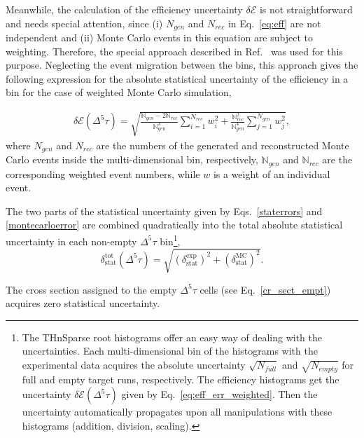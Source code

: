 Meanwhile, the calculation of the efficiency uncertainty $\delta \mathcal{E}$ is not straightforward and needs special attention, since (i) $N_{gen}$ and $N_{rec}$ in Eq.~\eqref{eq:eff} are not independent and (ii) Monte Carlo events in this equation are subject to weighting. Therefore, the special approach described in Ref.~\cite{Laforge:1996ts} was used for this purpose. Neglecting the event migration between the bins, this approach gives the following expression for the absolute statistical uncertainty of the efficiency in a bin for the case of weighted Monte Carlo simulation,

 

\begin{equation}
\begin{aligned}
\delta \mathcal{E}(\Delta^{5} \tau) = \sqrt{\frac{\mathbb{N}_{gen} - 2\mathbb{N}_{rec}}{\mathbb{N}_{gen}^{3}}\sum\limits_{i=1}^{N_{rec}} w_{i}^{2} + \frac{\mathbb{N}_{rec}^{2}}{\mathbb{N}_{gen}^{4}}\sum\limits_{j=1}^{N_{gen}} w_{j}^{2}},
\end{aligned}
\label{eq:eff_err_weighted}
\end{equation}
where $N_{gen}$ and $N_{rec}$ are the numbers of the generated and reconstructed Monte Carlo events inside the multi-dimensional bin, respectively, $\mathbb{N}_{gen}$ and  $\mathbb{N}_{rec}$ are the corresponding weighted event numbers, while $w$ is a weight of an individual event.


The two parts of the statistical uncertainty given by Eqs.~\eqref{staterrors} and \eqref{montecarloerror} are combined quadratically into the total absolute statistical uncertainty in each non-empty $\Delta^{5} \tau$ bin\footnote[3]{The THnSparse root histograms offer an easy way of dealing with the uncertainties. Each multi-dimensional bin of the histograms with the experimental data acquires the absolute uncertainty $\sqrt{N_{full}}$ and $\sqrt{N_{empty}}$ for full and empty target runs, respectively. The efficiency histograms get the uncertainty $\delta \mathcal{E}(\Delta^{5} \tau)$ given by Eq.~\eqref{eq:eff_err_weighted}. Then the uncertainty automatically propagates upon all manipulations with these histograms (addition, division, scaling).},
\begin{equation}
\delta_{\text{stat}}^{\text{tot}}(\Delta^{5} \tau) =
\sqrt{\left (\delta_{\text{stat}}^{\text{exp}} \right )^{2} + \left (\delta_{\text{stat}}^{\text{MC}}\right )^{2}}.
\label{errortot}
\end{equation}


The cross section assigned to the empty $\Delta^{5} \tau$ cells (see Eq.~\eqref{cr_sect_empt}) acquires zero statistical uncertainty.

